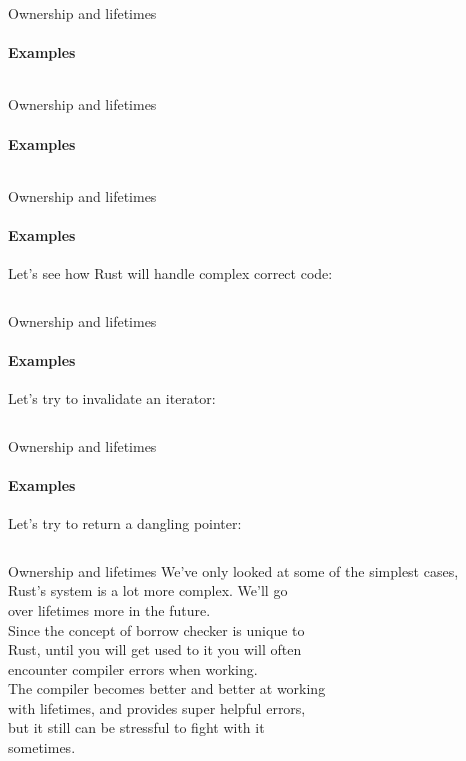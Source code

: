 \documentclass[usenames,dvipsnames,10pt,aspectratio=169]{beamer}
\begin{document}
\begin{frame}{Ownership and lifetimes}
	\framesubtitle{Examples}
	\inputminted[fontsize=\large]{rust}{code/own5.rs}
\end{frame}

\begin{frame}{Ownership and lifetimes}
	\framesubtitle{Examples}
	\inputminted[fontsize=\large]{rust}{code/own6.rs}
\end{frame}

\begin{frame}{Ownership and lifetimes}
	\framesubtitle{Examples}
	Let's see how Rust will handle complex correct code:
	\vspace{0.1cm}
	\inputminted[fontsize=\normalsize]{rust}{code/own7.rs}
	\vspace{0.5cm}
\end{frame}

\begin{frame}{Ownership and lifetimes}
	\framesubtitle{Examples}
	\large
	Let's try to invalidate an iterator:
	\vspace{0.3cm}
	\inputminted[fontsize=\large]{rust}{code/own8.rs}
	\vspace{0.5cm}
\end{frame}

\begin{frame}{Ownership and lifetimes}
	\framesubtitle{Examples}
	\large
	Let's try to return a dangling pointer:
	\vspace{0.3cm}
	\inputminted[fontsize=\large]{rust}{code/own9.rs}
	\vspace{0.5cm}
\end{frame}

\begin{frame}{Ownership and lifetimes}
\large	
We've only looked at some of the simplest cases,\\
Rust's system is a lot more complex. We'll go\\
over lifetimes more in the future.\\
\vspace{0.4cm}
Since the concept of borrow checker is unique to\\
Rust, until you will get used to it you will often\\
encounter compiler errors when working.\\
\vspace{0.1cm}
The compiler becomes better and better at working\\
with lifetimes, and provides super helpful errors,\\
but it still can be stressful to fight with it\\
sometimes.
\end{frame}
\end{document}
